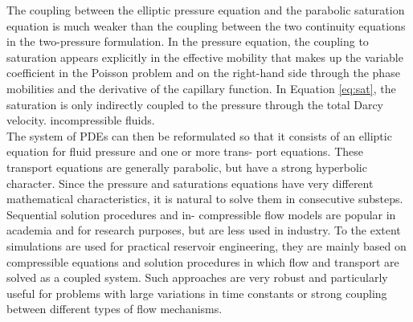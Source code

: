 \documentclass[a4paper,10pt]{report}
\begin{document}
The coupling between the elliptic pressure equation and the parabolic saturation equation is much weaker than the coupling between the two continuity
equations in the two-pressure formulation. In the pressure equation,
the coupling to saturation appears explicitly in the effective mobility that makes up the variable coefficient in the Poisson problem and on the
right-hand side through the phase mobilities and the derivative of the capillary function. In Equation \eqref{eq:sat}, the saturation is only indirectly
coupled to the pressure through the total Darcy velocity.
incompressible fluids. \\
The system of PDEs can then be reformulated so that
it consists of an elliptic equation for fluid pressure and one or more trans-
port equations. These transport equations are generally parabolic, but have a
strong hyperbolic character. Since the pressure and saturations equations have very different mathematical characteristics, it is natural
to solve them in consecutive substeps. Sequential solution procedures and in-
compressible flow models are popular in academia and for research purposes,
but are less used in industry. To the extent simulations are used for practical reservoir engineering, they are mainly based on compressible equations
and solution procedures in which flow and transport are solved as a coupled
system. Such approaches are very robust and particularly useful for problems
with large variations in time constants or strong coupling between different
types of flow mechanisms. 
\end{document}
